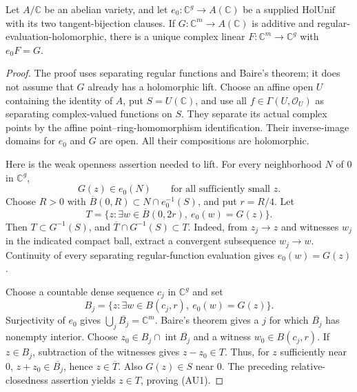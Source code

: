 \begin{srlemma}
\label{lem:ftb-holomorphic-linear-lift}
Let \(A/\mathbb C\) be an abelian variety, and let
\(e_0:\mathbb C^g\to A(\mathbb C)\) be a supplied
\(\mathrm{HolUnif}\) with its two tangent-bijection clauses.
If \(G:\mathbb C^m\to A(\mathbb C)\) is additive and
regular-evaluation-holomorphic, there is a unique complex
linear \(F:\mathbb C^m\to\mathbb C^g\) with
\(e_0F=G\).
\end{srlemma}
\begin{proof}
The proof uses separating regular functions and Baire's theorem;
it does not assume that \(G\) already has a holomorphic lift.
Choose an affine open \(U\) containing the identity of \(A\),
put \(S=U(\mathbb C)\), and use all \(f\in\Gamma(U,\mathcal O_U)\)
as separating complex-valued functions on \(S\).
They separate its actual complex points by the affine
point--ring-homomorphism identification.
Their inverse-image domains for \(e_0\) and \(G\) are open.
All their compositions are holomorphic.

Here is the weak openness assertion needed to lift.
For every neighborhood \(N\) of \(0\) in \(\mathbb C^g\),
\[
                 G(z)\in e_0(N)\qquad\text{for all sufficiently small }z.
                                                               \tag{AU1}
\]
Choose \(R>0\) with
\(\overline B(0,R)\subset N\cap e_0^{-1}(S)\), and put \(r=R/4\).
Let
\[
 T=\{z:\exists w\in\overline B(0,2r),\ e_0(w)=G(z)\}.
\]
Then \(T\subset G^{-1}(S)\), and
\(\overline T\cap G^{-1}(S)\subset T\).
Indeed, from \(z_j\to z\) and witnesses \(w_j\) in the indicated
compact ball, extract a convergent subsequence \(w_j\to w\).
Continuity of every separating regular-function evaluation
gives \(e_0(w)=G(z)\).

Choose a countable dense sequence \(c_j\) in \(\mathbb C^g\)
and set
\[
 B_j=\{z:\exists w\in B(c_j,r),\ e_0(w)=G(z)\}.
\]
Surjectivity of \(e_0\) gives
\(\bigcup_j\overline{B_j}=\mathbb C^m\).
Baire's theorem gives a \(j\) for which
\(\overline{B_j}\) has nonempty interior.
Choose \(z_0\in B_j\cap\operatorname{int}\overline{B_j}\)
and a witness \(w_0\in B(c_j,r)\).
If \(z\in B_j\), subtraction of the witnesses gives
\(z-z_0\in T\).
Thus, for \(z\) sufficiently near \(0\),
\(z+z_0\in\overline{B_j}\), hence \(z\in\overline T\).
Also \(G(z)\in S\) near \(0\).
The preceding relative-closedness assertion yields \(z\in T\),
proving (AU1).


\end{proof}
